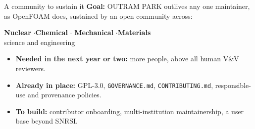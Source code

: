 \documentclass[aspectratio=169]{beamer}
\begin{document}
\begin{frame}{A community to sustain it}
    \textbf{Goal:} OUTRAM PARK outlives any one maintainer, as OpenFOAM
    does, sustained by an open community across:

    \medskip
    \begin{center}
        \textbf{Nuclear} \quad$\cdot$\quad \textbf{Chemical} \quad$\cdot$\quad
        \textbf{Mechanical} \quad$\cdot$\quad \textbf{Materials}
        \\ science and engineering
    \end{center}

    \medskip
    \begin{itemize}
        \item \textbf{Needed in the next year or two:} more people, above
              all human V\&V reviewers.
        \item \textbf{Already in place:} GPL-3.0, \texttt{GOVERNANCE.md},
              \texttt{CONTRIBUTING.md}, responsible-use and provenance
              policies.
        \item \textbf{To build:} contributor onboarding, multi-institution
              maintainership, a user base beyond SNRSI.
    \end{itemize}
\end{frame}
\end{document}
